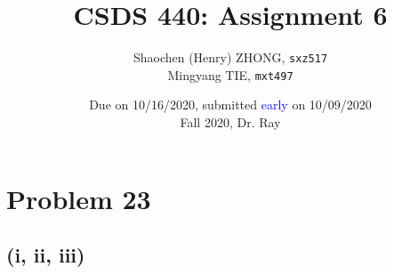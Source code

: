 \documentclass[12pt]{article}
\newcommand{\ilcode}{\texttt}
\begin{document}
\title{\textbf{CSDS 440: Assignment 6}}

\author{Shaochen (Henry) ZHONG, \ilcode{sxz517} \\ Mingyang TIE, \ilcode{mxt497}}
\date{Due on 10/16/2020, submitted \textcolor{blue}{early} on 10/09/2020 \\ Fall 2020, Dr. Ray}
\maketitle


\section{Problem 23}

\subsection{(i, ii, iii)}
\end{document}
